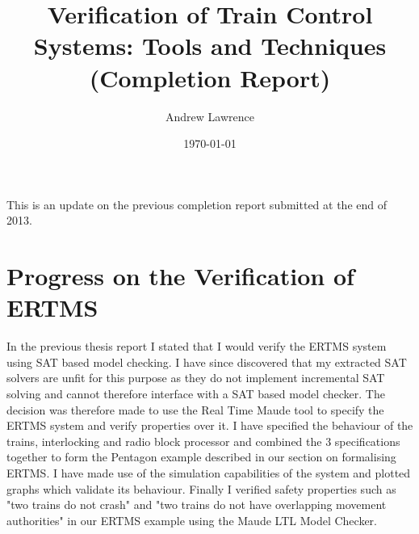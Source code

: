 \documentclass{article}
\title{Verification of Train Control Systems: Tools and Techniques (Completion Report)}
\date{\today}
\author{ 
   Andrew Lawrence}
\begin{document}
\maketitle
This is an update on the  previous completion report submitted at the end of 2013.



\section{Progress on the Verification of ERTMS}
In the previous thesis report I stated that I would verify the ERTMS system using SAT based model checking. I have since discovered that my extracted SAT solvers are unfit for this purpose as they do not implement incremental SAT solving and cannot therefore interface with a SAT based model checker. The decision was therefore made to use the Real Time Maude tool to specify the ERTMS system and verify properties over it. I have specified the behaviour of the trains, interlocking and radio block processor and combined the 3 specifications together to form the Pentagon example described in our section on formalising ERTMS. I have made use of the simulation capabilities of the system and plotted graphs which validate its behaviour. Finally I verified safety properties such as "two trains do not crash" and "two trains do not have overlapping movement authorities" in our ERTMS example using the Maude LTL Model Checker.
\end{document}
